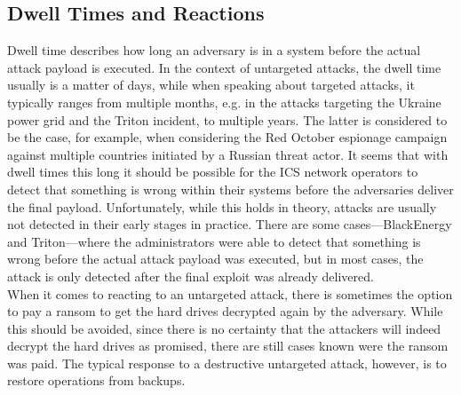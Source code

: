\documentclass[runningheads]{llncs}
\begin{document}
\subsection{Dwell Times and Reactions}
\label{subsection:overview-reactions}
Dwell time describes how long an adversary is in a system before the actual attack payload is executed.
In the context of untargeted attacks, the dwell time usually is a matter of days, while when speaking about targeted attacks, it typically ranges from multiple months, e.g. in the attacks targeting the Ukraine power grid and the Triton incident, to multiple years.
The latter is considered to be the case, for example, when considering the Red October espionage campaign against multiple countries initiated by a Russian threat actor.
It seems that with dwell times this long it should be possible for the ICS network operators to detect that something is wrong within their systems before the adversaries deliver the final payload.
Unfortunately, while this holds in theory, attacks are usually not detected in their early stages in practice.
There are some cases---BlackEnergy and Triton---where the administrators were able to detect that something is wrong before the actual attack payload was executed, but in most cases, the attack is only detected after the final exploit was already delivered.\\
When it comes to reacting to an untargeted attack, there is sometimes the option to pay a ransom to get the hard drives decrypted again by the adversary.
While this should be avoided, since there is no certainty that the attackers will indeed decrypt the hard drives as promised, there are still cases known were the ransom was paid.
The typical response to a destructive untargeted attack, however, is to restore operations from backups.
\end{document}
